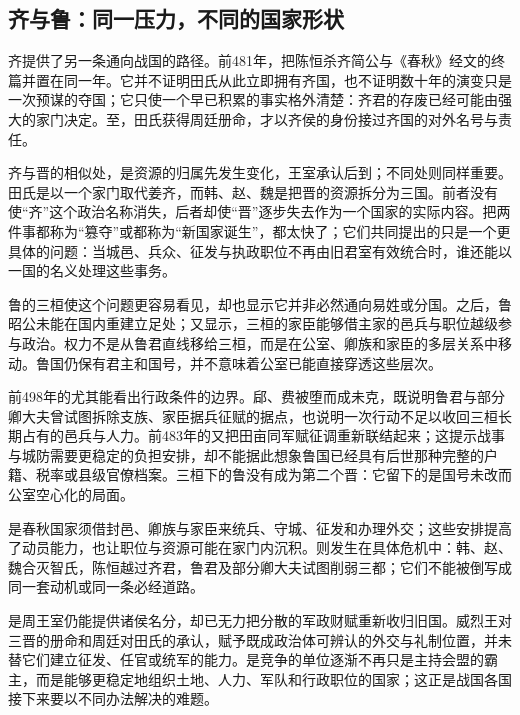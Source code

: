 \subsection{齐与鲁：同一压力，不同的国家形状}

齐提供了另一条通向战国的路径。前481年，把陈恒杀齐简公与《春秋》经文的终篇并置在同一年。它并不证明田氏从此立即拥有齐国，也不证明数十年的演变只是一次预谋的夺国；它只使一个早已积累的事实格外清楚：齐君的存废已经可能由强大的家门决定。至，田氏获得周廷册命，才以齐侯的身份接过齐国的对外名号与责任。

齐与晋的相似处，是资源的归属先发生变化，王室承认后到；不同处则同样重要。田氏是以一个家门取代姜齐，而韩、赵、魏是把晋的资源拆分为三国。前者没有使“齐”这个政治名称消失，后者却使“晋”逐步失去作为一个国家的实际内容。把两件事都称为“篡夺”或都称为“新国家诞生”，都太快了；它们共同提出的只是一个更具体的问题：当城邑、兵众、征发与执政职位不再由旧君室有效统合时，谁还能以一国的名义处理这些事务。

鲁的三桓使这个问题更容易看见，却也显示它并非必然通向易姓或分国。之后，鲁昭公未能在国内重建立足处；又显示，三桓的家臣能够借主家的邑兵与职位越级参与政治。权力不是从鲁君直线移给三桓，而是在公室、卿族和家臣的多层关系中移动。鲁国仍保有君主和国号，并不意味着公室已能直接穿透这些层次。

前498年的尤其能看出行政条件的边界。郈、费被堕而成未克，既说明鲁君与部分卿大夫曾试图拆除支族、家臣据兵征赋的据点，也说明一次行动不足以收回三桓长期占有的邑兵与人力。前483年的又把田亩同军赋征调重新联结起来；这提示战事与城防需要更稳定的负担安排，却不能据此想象鲁国已经具有后世那种完整的户籍、税率或县级官僚档案。三桓下的鲁没有成为第二个晋：它留下的是国号未改而公室空心化的局面。

\begin{causalchain}[从家门竞争到列国竞争]
是春秋国家须借封邑、卿族与家臣来统兵、守城、征发和办理外交；这些安排提高了动员能力，也让职位与资源可能在家门内沉积。则发生在具体危机中：韩、赵、魏合灭智氏，陈恒越过齐君，鲁君及部分卿大夫试图削弱三都；它们不能被倒写成同一套动机或同一条必经道路。

是周王室仍能提供诸侯名分，却已无力把分散的军政财赋重新收归旧国。威烈王对三晋的册命和周廷对田氏的承认，赋予既成政治体可辨认的外交与礼制位置，并未替它们建立征发、任官或统军的能力。是竞争的单位逐渐不再只是主持会盟的霸主，而是能够更稳定地组织土地、人力、军队和行政职位的国家；这正是战国各国接下来要以不同办法解决的难题。
\end{causalchain}

